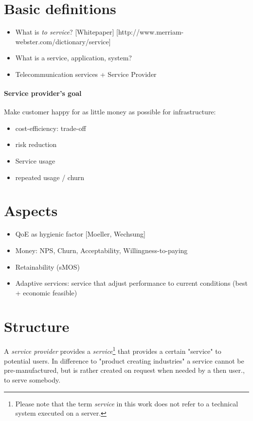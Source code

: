 \section{Basic definitions}
\begin{itemize}
\item What is \emph{to service}? [Whitepaper] [http://www.merriam-webster.com/dictionary/service] 
\item What is a service, application, system?
\item Telecommunication services + Service Provider %
\end{itemize}

\paragraph*{Service provider's goal}
Make customer happy for as little money as possible for infrastructure: 
\begin{itemize}
\item cost-efficiency: trade-off
\item risk reduction
\item Service usage
\item repeated usage / churn
\end{itemize}

\section{Aspects}
\begin{itemize}
\item QoE as hygienic factor [Moeller, Wechsung]  
\item Money: NPS, Churn, Acceptability, Willingness-to-paying
\item Retainability (sMOS)
\item Adaptive services: service that adjust performance to current conditions (best + economic feasible)
\end{itemize}

\section{Structure}


A \emph{service provider} provides a \emph{service}\footnote{Please note that the term \emph{service} in this work does not refer to a technical system executed on a server.} that provides a certain "service" to potential users.
In difference to "product creating industries" a service cannot be pre-manufactured, but is rather created on request when needed by a then user., \ie to serve somebody.

